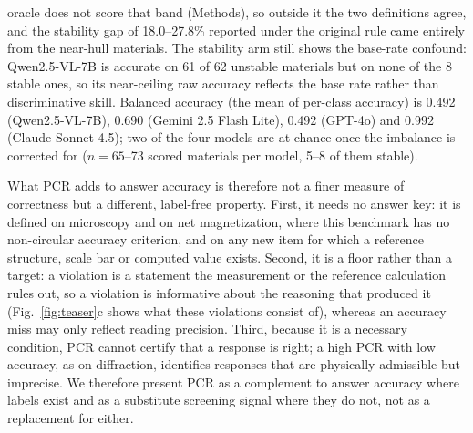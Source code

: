 \documentclass[pdflatex,sn-nature]{sn-jnl}
\newcommand{\rev}[1]{#1} %
\newcommand{\rev}[1]{{\color{blue}#1}} %
\providecommand{\DIFadd}[1]{{\protect\color{blue} \sf #1}} %
\providecommand{\DIFaddbegin}{} %
\providecommand{\DIFaddend}{} %
\providecommand{\DIFaddincludegraphics}[2][]{{\color{blue}\fbox{\DIFOincludegraphics[#1]{#2}}}} %
\DeclareRobustCommand{\DIFaddbegin}{\DIFOaddbegin \let\includegraphics\DIFaddincludegraphics} %
\DeclareRobustCommand{\DIFaddend}{\DIFOaddend \let\includegraphics\DIFOincludegraphics} %
\begin{document}
{{oracle does not score that band (Methods), so outside it the two definitions agree, and the stability gap
of 18.0--27.8\% reported under the original rule came entirely from the near-hull materials. The stability
arm still shows the base-rate confound: Qwen2.5-VL-7B is accurate on 61 of 62 unstable materials but on
none of the 8 stable ones, so its near-ceiling raw accuracy reflects the base rate rather than
discriminative skill. Balanced accuracy (the mean of per-class accuracy) is 0.492 (Qwen2.5-VL-7B), 0.690
(Gemini 2.5 Flash Lite), 0.492 (GPT-4o) and 0.992 (Claude Sonnet 4.5); two of the four models are at
chance once the imbalance is corrected for ($n=65$--73 scored materials per model, 5--8 of them stable).}
}\DIFaddend 

\DIFaddbegin \DIFadd{\rev{What PCR adds to answer accuracy is therefore not a finer measure of correctness but a
different, label-free property. First, it needs no answer key: it is defined on microscopy and
on net magnetization, where this benchmark has no non-circular accuracy criterion, and on any new
item for which a reference structure, scale bar or computed value exists. Second, it is a floor
rather than a target: a violation is a statement the measurement or the reference calculation
rules out, so a violation is informative about the reasoning that produced it (Fig.~\ref{fig:teaser}c
shows what these violations consist of), whereas an accuracy miss may only reflect reading
precision. Third, because it is a necessary condition, PCR cannot certify that a response is
right; a high PCR with low accuracy, as on diffraction, identifies responses that are physically
admissible but imprecise. We therefore present PCR as a complement to answer accuracy where labels
exist and as a substitute screening signal where they do not, not as a replacement for either.}
}
\end{document}
